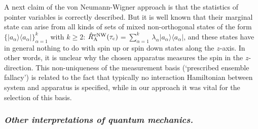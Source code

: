 \documentclass[12pt, onecolumn, aps,prb,floatfix]{revtex4-2}
\newcommand{\tauc}{{\tau_{\rm c}}}
\newcommand{\RA}{{\rm A}}
\newcommand{\down}{{\downarrow}}
\newcommand{\up}{{\uparrow}}
\newcommand{\tf}{t_{\rm f}}
\begin{document}






A next claim of the   von Neumann-Wigner approach is that the statistics of pointer 
variables is correctly described. But it is well known that their marginal state 
can arise from all kinds of  sets of mixed non-orthogonal states of the form 
$\{|a_\alpha\rangle\langle a_\alpha|\}_{\alpha=1}^k$ with $k\geq 2$:
${\hat R}_\RA^{\rm vNW}(\tauc)$$
=\sum_{\alpha=1}^k\, \lambda_\alpha |a_\alpha\rangle\langle a_\alpha|$, 
and these states have in general nothing to do with spin up or spin down states along the 
$z$-axis. In other words, it is unclear why the chosen apparatus measures the
spin in the $z$-direction. This non-uniqueness of the measurement basis 
(`prescribed ensemble fallacy') is related to the fact that 
typically no interaction Hamiltonian between system and apparatus is
specified, while in our approach it was vital for the selection of this basis.

\subsubsection*{\it Other interpretations of quantum mechanics.}
\end{document}
